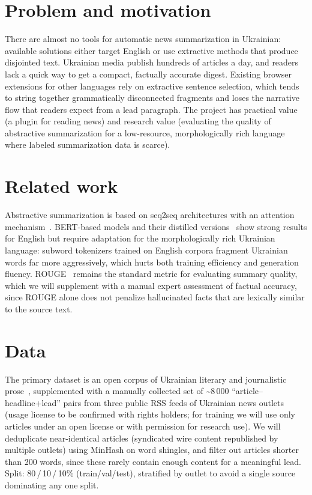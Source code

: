 \documentclass[english]{ucuproposal}
\begin{document}
\maketitlepage

\section{Problem and motivation}
There are almost no tools for automatic news summarization in Ukrainian:
available solutions either target English or use extractive methods that
produce disjointed text. Ukrainian media publish hundreds of articles a
day, and readers lack a quick way to get a compact, factually accurate
digest. Existing browser extensions for other languages rely on
extractive sentence selection, which tends to string together
grammatically disconnected fragments and loses the narrative flow that
readers expect from a lead paragraph. The project has practical value (a
plugin for reading news) and research value (evaluating the quality of
abstractive summarization for a low-resource, morphologically rich
language where labeled summarization data is scarce).

\section{Related work}
Abstractive summarization is based on seq2seq architectures with an
attention mechanism~\cite{vaswani2017attention}. BERT-based models and
their distilled versions~\cite{devlin2019bert,sanh2019distilbert} show
strong results for English but require adaptation for the morphologically
rich Ukrainian language: subword tokenizers trained on English corpora
fragment Ukrainian words far more aggressively, which hurts both training
efficiency and generation fluency. ROUGE~\cite{lin2004rouge} remains the
standard metric for evaluating summary quality, which we will supplement
with a manual expert assessment of factual accuracy, since ROUGE alone
does not penalize hallucinated facts that are lexically similar to the
source text.

\section{Data}
The primary dataset is an open corpus of Ukrainian literary and
journalistic prose~\cite{ukrlit2023}, supplemented with a manually
collected set of \textasciitilde{}8\,000 ``article--headline+lead'' pairs
from three public RSS feeds of Ukrainian news outlets (usage license to
be confirmed with rights holders; for training we will use only articles
under an open license or with permission for research use). We will
deduplicate near-identical articles (syndicated wire content republished
by multiple outlets) using MinHash on word shingles, and filter out
articles shorter than 200 words, since these rarely contain enough
content for a meaningful lead. Split: 80\,/\,10\,/\,10\% (train/val/test),
stratified by outlet to avoid a single source dominating any one split.
\end{document}

